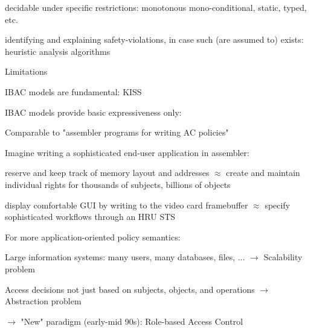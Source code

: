 \documentclass[a4paper]{article}
\begin{document}
\begin{multicols}{3}
\begin{itemize*}
\begin{itemize*}
\begin{itemize*}
\begin{itemize*}
                    \item decidable under specific restrictions: monotonous mono-conditional, static, typed, etc.
                    \item identifying and explaining safety-violations, in case such (are assumed to) exists: heuristic analysis algorithms
                \end{itemize*}
            \end{itemize*}
        \end{itemize*}
        \item Limitations
        \begin{itemize*}
            \item IBAC models are fundamental: KISS
            \item IBAC models provide basic expressiveness only:
            \begin{itemize*}
                \item Comparable to "assembler programs for writing AC policies"
                \item Imagine writing a sophisticated end-user application in assembler:
                \begin{itemize*}
                    \item reserve and keep track of memory layout and addresses $\approx$ create and maintain individual rights for thousands of subjects, billions of objects
                    \item display comfortable GUI by writing to the video card framebuffer $\approx$ specify sophisticated workflows through an HRU STS
                \end{itemize*}
            \end{itemize*}
            \item For more application-oriented policy semantics:
            \begin{itemize*}
                \item Large information systems: many users, many databases, files, ... $\rightarrow$ Scalability problem
                \item Access decisions not just based on subjects, objects, and operations $\rightarrow$ Abstraction problem
            \end{itemize*}
        \end{itemize*}
    \end{itemize*}

    $\rightarrow$ "New" paradigm (early-mid 90s): Role-based Access Control


\end{multicols}
\end{document}
